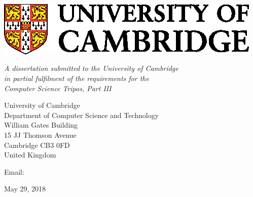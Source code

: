 \begin{titlepage} 

\begin{center}
\noindent
\huge
\dissertationtitle \\
\end{center}

\begin{center}
\noindent
\huge
\authorname \\
\Large
\authorcollege      \\[24pt]
\includegraphics{CUni3.eps}
\end{center}

\vspace{24pt} 

\begin{center}
\noindent
\large
{\it A dissertation submitted to the University of Cambridge \\ 
in partial fulfilment of the requirements for the\\ 
Computer Science Tripos, Part III}
\end{center}

\begin{center}
\noindent
University of Cambridge \\
Department of Computer Science and Technology \\
William Gates Building  \\
15 JJ Thomson Avenue    \\
Cambridge CB3 0FD       \\
{\sc United Kingdom}    \\
\end{center}

\begin{center}
\noindent
Email: \authoremail \\
\end{center}

\begin{center}
\noindent
May 29, 2018
\end{center}

\end{titlepage} 

\cleardoublepage%
